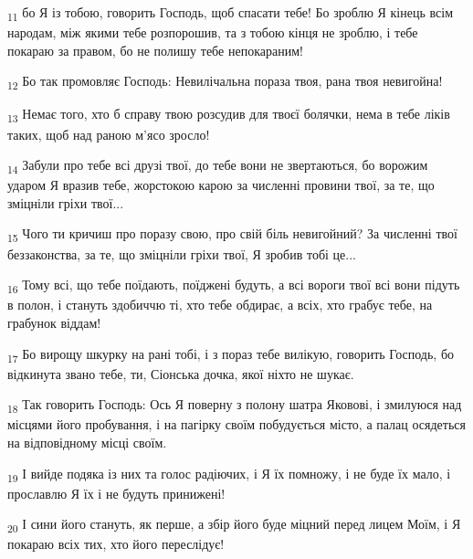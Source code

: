 \begin{tcolorbox}
\textsubscript{11} бо Я із тобою, говорить Господь, щоб спасати тебе! Бо зроблю Я кінець всім народам, між якими тебе розпорошив, та з тобою кінця не зроблю, і тебе покараю за правом, бо не полишу тебе непокараним!
\end{tcolorbox}
\begin{tcolorbox}
\textsubscript{12} Бо так промовляє Господь: Невилічальна пораза твоя, рана твоя невигойна!
\end{tcolorbox}
\begin{tcolorbox}
\textsubscript{13} Немає того, хто б справу твою розсудив для твоєї болячки, нема в тебе ліків таких, щоб над раною м'ясо зросло!
\end{tcolorbox}
\begin{tcolorbox}
\textsubscript{14} Забули про тебе всі друзі твої, до тебе вони не звертаються, бо ворожим ударом Я вразив тебе, жорстокою карою за численні провини твої, за те, що зміцніли гріхи твої...
\end{tcolorbox}
\begin{tcolorbox}
\textsubscript{15} Чого ти кричиш про поразу свою, про свій біль невигойний? За численні твої беззаконства, за те, що зміцніли гріхи твої, Я зробив тобі це...
\end{tcolorbox}
\begin{tcolorbox}
\textsubscript{16} Тому всі, що тебе поїдають, поїджені будуть, а всі вороги твої всі вони підуть в полон, і стануть здобиччю ті, хто тебе обдирає, а всіх, хто грабує тебе, на грабунок віддам!
\end{tcolorbox}
\begin{tcolorbox}
\textsubscript{17} Бо вирощу шкурку на рані тобі, і з пораз тебе вилікую, говорить Господь, бо відкинута звано тебе, ти, Сіонська дочка, якої ніхто не шукає.
\end{tcolorbox}
\begin{tcolorbox}
\textsubscript{18} Так говорить Господь: Ось Я поверну з полону шатра Яковові, і змилуюся над місцями його пробування, і на пагірку своїм побудується місто, а палац осядеться на відповідному місці своїм.
\end{tcolorbox}
\begin{tcolorbox}
\textsubscript{19} І вийде подяка із них та голос радіючих, і Я їх помножу, і не буде їх мало, і прославлю Я їх і не будуть принижені!
\end{tcolorbox}
\begin{tcolorbox}
\textsubscript{20} І сини його стануть, як перше, а збір його буде міцний перед лицем Моїм, і Я покараю всіх тих, хто його переслідує!
\end{tcolorbox}
